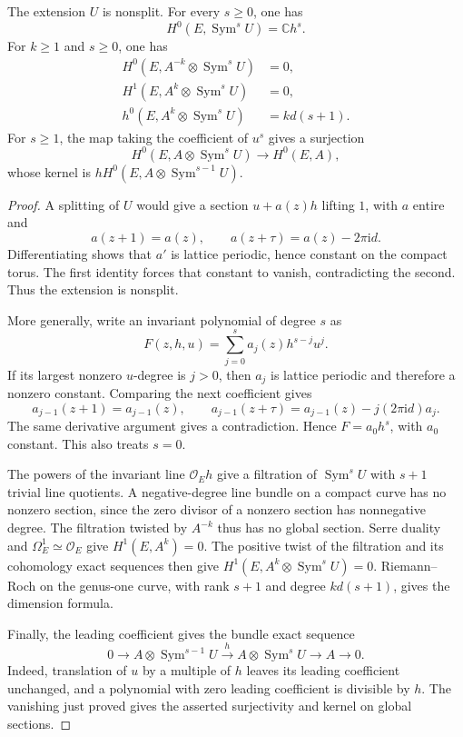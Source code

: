 \begin{lemma}\label{lem:elliptic-unipotent-symmetric-cohomology}
The extension $U$ is nonsplit. For every $s\geq0$, one has
\[
 H^0(E,\operatorname{Sym}^sU)=\mathbb C h^s.
\]
For $k\geq1$ and $s\geq0$, one has
\[
 \begin{aligned}
 H^0(E,A^{-k}\otimes\operatorname{Sym}^sU)&=0,\\
 H^1(E,A^k\otimes\operatorname{Sym}^sU)&=0,\\
 h^0(E,A^k\otimes\operatorname{Sym}^sU)&=kd(s+1).
 \end{aligned}
\]
For $s\geq1$, the map taking the coefficient of $u^s$ gives a surjection
\[
 H^0(E,A\otimes\operatorname{Sym}^sU)\longrightarrow H^0(E,A),
\]
whose kernel is $hH^0(E,A\otimes\operatorname{Sym}^{s-1}U)$.
\end{lemma}
\begin{proof}
A splitting of $U$ would give a section $u+a(z)h$ lifting $1$, with $a$ entire and
\[
 a(z+1)=a(z),\qquad a(z+\tau)=a(z)-2\pi\mathrm{i}d.
\]
Differentiating shows that $a'$ is lattice periodic, hence constant on the compact torus. The first identity forces that constant to vanish, contradicting the second. Thus the extension is nonsplit.

More generally, write an invariant polynomial of degree $s$ as
\[
 F(z,h,u)=\sum_{j=0}^s a_j(z)h^{s-j}u^j.
\]
If its largest nonzero $u$-degree is $j>0$, then $a_j$ is lattice periodic and therefore a nonzero constant. Comparing the next coefficient gives
\[
 a_{j-1}(z+1)=a_{j-1}(z),\qquad
 a_{j-1}(z+\tau)=a_{j-1}(z)-j(2\pi\mathrm{i}d)a_j.
\]
The same derivative argument gives a contradiction. Hence $F=a_0h^s$, with $a_0$ constant. This also treats $s=0$.

The powers of the invariant line $\mathcal O_Eh$ give a filtration of $\operatorname{Sym}^sU$ with $s+1$ trivial line quotients. A negative-degree line bundle on a compact curve has no nonzero section, since the zero divisor of a nonzero section has nonnegative degree. The filtration twisted by $A^{-k}$ thus has no global section. Serre duality and $\Omega_E^1\simeq\mathcal O_E$ give $H^1(E,A^k)=0$. The positive twist of the filtration and its cohomology exact sequences then give $H^1(E,A^k\otimes\operatorname{Sym}^sU)=0$. Riemann--Roch on the genus-one curve, with rank $s+1$ and degree $kd(s+1)$, gives the dimension formula.

Finally, the leading coefficient gives the bundle exact sequence
\[
 0\longrightarrow A\otimes\operatorname{Sym}^{s-1}U
 \xrightarrow{\ h\ }A\otimes\operatorname{Sym}^sU
 \longrightarrow A\longrightarrow0.
\]
Indeed, translation of $u$ by a multiple of $h$ leaves its leading coefficient unchanged, and a polynomial with zero leading coefficient is divisible by $h$. The vanishing just proved gives the asserted surjectivity and kernel on global sections.
\end{proof}

